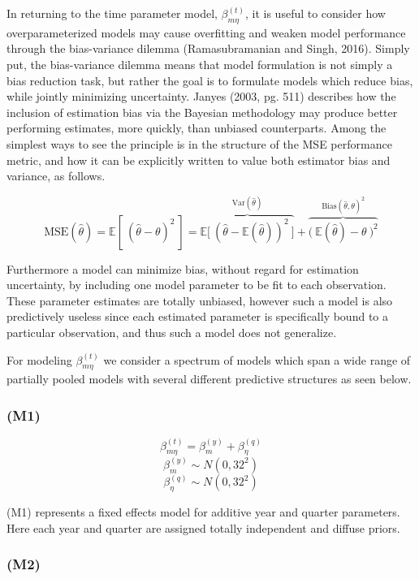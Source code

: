 \documentclass[12pt]{article}
\begin{document}
In returning to the time parameter model, \(\beta^{(t)}_{m\eta}\), it is
useful to consider how overparameterized models may cause overfitting
and weaken model performance through the bias-variance dilemma
(Ramasubramanian and Singh, 2016). Simply put, the bias-variance
dilemma means that model formulation is not simply a bias reduction
task, but rather the goal is to formulate models which reduce bias,
while jointly minimizing uncertainty. Janyes (2003, pg. 511) describes
how the inclusion of estimation bias via the Bayesian methodology may
produce better performing estimates, more quickly, than unbiased
counterparts. Among the simplest ways to see the principle is in the
structure of the MSE performance metric, and how it can be explicitly
written to value both estimator bias and variance, as follows.

\[\text{MSE}(\hat\theta) = \mathbb{E}\left[~(\hat\theta - \theta)^2~\right] = \overbrace{\mathbb{E}\Big[~\left(\hat\theta-\mathbb{E}(\hat\theta)\right)^2~\Big]}^{\text{Var}(\hat \theta)} + \overbrace{\Big(~\mathbb{E}(\hat\theta)-\theta~\Big)^2}^{\text{Bias}(\hat \theta, \theta)^2}\]

Furthermore a model can minimize bias, without regard for estimation
uncertainty, by including one model parameter to be fit to each
observation. These parameter estimates are totally unbiased, however
such a model is also predictively useless since each estimated parameter
is specifically bound to a particular observation, and thus such a model does not generalize.

For modeling \(\beta^{(t)}_{m\eta}\) we consider a spectrum of models
which span a wide range of partially pooled models with several
different predictive structures as seen below.

\subsubsection{(M1)}\label{m1}

\[\beta^{(t)}_{m\eta} = \beta^{(y)}_{m} + \beta^{(q)}_{\eta}\]
\[\beta^{(y)}_{m} \sim N(0, 32^2)\]
\[\beta^{(q)}_{\eta} \sim N(0, 32^2)\]

(M1) represents a fixed effects model for additive year and quarter
parameters. Here each year and quarter are assigned totally independent
and diffuse priors.

\subsubsection{(M2)}\label{m2}
\end{document}
